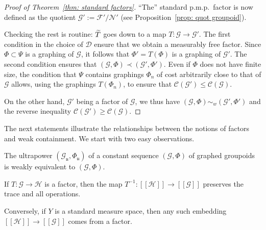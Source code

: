 \documentclass[AHL,Unicode,longabstracts,published]{cedram}
\newcommand{\cH}{\mathcal{H}}
\newcommand{\cost}{\mathcal{C}}
\newcommand{\cn}{\mathcal{N}}
\newcommand{\cg}{\mathcal{G}}
\newcommand{\cf}{\mathcal{F}}
\newcommand{\cd}{\mathcal{D}}
\newcommand{\ul}{\mathfrak{u}}
\newcommand{\pmp}{p.m.p.\ }
\let\oldtilde\tilde
\renewcommand*{\tilde}[1]{\mathchoice{\widetilde{#1}}{\widetilde{#1}}{\oldtilde{#1}}{\oldtilde{#1}}}
\begin{document}
\begin{proof}[Proof of Theorem~\ref{thm: standard factors}]
``The'' standard \pmp factor is now defined as the quotient $\cg':=\cf'/\cn'$ (see Proposition~\ref{prop: quot groupoid}).

Checking the rest is routine: $\tilde{T}$ goes down to a map $T:\cg\to \cg'$. The first condition in the choice of $\cd$ ensure that we obtain a measurably free factor. Since $\Phi\subset \Psi$ is a graphing of $\cg$, it follows that $\Phi'=T(\Phi)$ is a graphing of $\cg'$. The second condition ensures that $(\cg, \Phi)\prec (\cg',\Phi')$. Even if $\Phi$ does not have finite size, the condition that $\Psi$ contains graphings $\Phi_n$ of cost arbitrarily close to that of $\cg$ allows, using the graphings $T(\Phi_n)$, to ensure that $\cost(\cg')\leq \cost(\cg)$.

On the other hand, $\cg'$ being a factor of $\cg$, we thus have $(\cg, \Phi)\sim_{w} (\cg',\Phi')$ and the reverse inequality $\cost(\cg')\geq \cost(\cg)$.
\end{proof}

The next statements illustrate the relationships between the notions of factors and weak containment. We start with two easy observations.

\begin{lemm}\label{lem:ultrapower_weakly_equiv}
The ultrapower $(\cg_\ul,\Phi_\ul)$ of a constant sequence $(\cg, \Phi)$ of graphed groupoids is weakly equivalent to $(\cg,\Phi)$.
\end{lemm}

\begin{lemm}\label{Lem: factors vs full pseudogroups}
If $T\colon \cg \to \cH$ is a factor, then the map $T^{-1}\colon [[\cH]] \to [[\cg]]$ preserves the trace and all operations.

Conversely, if $Y$ is a standard measure space, then any such embedding $[[\cH]] \to [[\cg]]$ comes from a factor.
\end{lemm}
\end{document}

